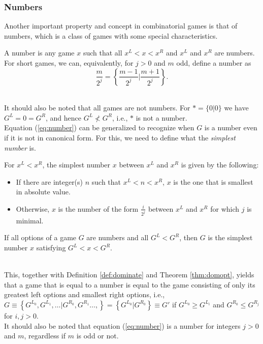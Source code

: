 \subsubsection{Numbers}
\label{section:numbers}
Another important property and concept in combinatorial games is that of numbers, which is a class of games with some special characteristics. 
\begin{defn}
A number is any game $x$ such that all $x^L<x<x^R$ and $x^L$ and $x^R$ are numbers.
For short games, we can, equivalently, for $j>0$ and $m$ odd, define a number as
\begin{equation}
\frac{m}{2^j}=\left\{\frac{m-1}{2^j}\Bigg|\frac{m+1}{2^j}\right\}.
\label{eq:number}
\end{equation}
\label{def:number}
\end{defn}
~\\
It should also be noted that all games are not numbers. For $*=\{0|0\}$ we have $G^L=0=G^R$, and hence $G^L\not<G^R$, i.e., $*$ is not a number.
\\
Equation (\ref{eq:number}) can be generalized to recognize when $G$ is a number even if it is not in canonical form. For this, we need to define what the \emph{simplest number} is.
\begin{defn}
\label{def:simpnum}
For $x^L<x^R$, the simplest number $x$ between $x^L$ and $x^R$ is given by the following:
\begin{itemize}
\item If there are integer(s) $n$ such that $x^L<n<x^R$, $x$ is the one that is smallest in absolute value.
\item Otherwise, $x$ is the number of the form $\frac{i}{2^j}$ between $x^L$ and $x^R$ for which $j$ is minimal.
\end{itemize}
\end{defn}
\begin{thm}
\label{thm:number}
If all options of a game $G$ are numbers and all $G^L<G^R$, then $G$ is the simplest number $x$ satisfying $G^L<x<G^R$. 
\end{thm}
~\\
This, together with Definition \ref{def:dominate} and Theorem \ref{thm:domopt}, yields that a game that is equal to a number is equal to the game consisting of only its greatest left options and smallest right options, i.e., 
$G\equiv\left\{G^{L_0},G^{L_1},\dots|G^{R_0},G^{R_1}\dots,\right\}=\left\{G^{L_0}|G^{R_0}\right\}\equiv G'$ if $G^{L_0}\ge G^{L_i}$ and $G^{R_0}\le G^{R_j}$ for $i,j>0$. 
\\
It should also be noted that equation (\ref{eq:number}) is a number for integers $j>0$ and $m$, regardless if $m$ is odd or not.

